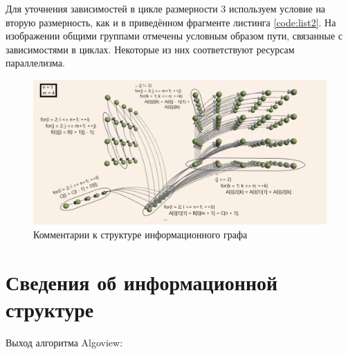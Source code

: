 \documentclass[12pt, fleqn]{article}
\theoremstyle{definition}
\begin{document}
Для уточнения зависимостей в цикле размерности 3 используем условие на вторую размерность, как и в приведённом фрагменте листинга \ref{code:list2}. На изображении общими группами отмечены условным образом пути, связанные с зависимостями в циклах. Некоторые из них соответствуют ресурсам параллелизма.
\begin{figure}[ht]
\begin{center}
 \includegraphics[scale=0.575]{main.png}
 \caption{Комментарии к структуре информационного графа}
 \label{fig:main}
\end{center}
\end{figure}

\section{Сведения об информационной структуре}
Выход алгоритма Algoview: 
\end{document}
